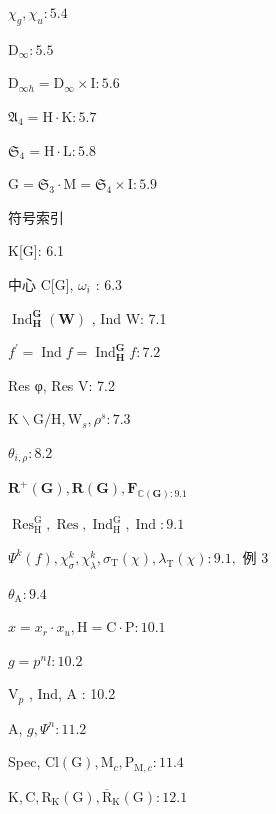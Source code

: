 \documentclass[10pt]{article}
\begin{document}
\({\chi }_{g},{\chi }_{u} : {5.4}\)

\({\mathrm{D}}_{\infty } : {5.5}\)

\({\mathrm{D}}_{\infty h} = {\mathrm{D}}_{\infty } \times  \mathrm{I} : {5.6}\)

\({\mathfrak{A}}_{4} = \mathrm{H} \cdot  \mathrm{K} : {5.7}\)

\({\mathfrak{S}}_{4} = \mathrm{H} \cdot  \mathrm{L} : {5.8}\)

\(\mathrm{G} = {\mathfrak{S}}_{3} \cdot  \mathrm{M} = {\mathfrak{S}}_{4} \times  \mathrm{I} : {5.9}\)

符号索引

K[G]: 6.1

中心 C[G], \({\omega }_{i}\) : 6.3

\({\operatorname{Ind}}_{\mathbf{H}}^{\mathbf{G}}\left( \mathbf{W}\right)\) , Ind W: 7.1

\({f}^{\prime } = \operatorname{Ind}f = {\operatorname{Ind}}_{\mathbf{H}}^{\mathbf{G}}f : {7.2}\)

Res φ, Res V: 7.2

\(\mathrm{K} \smallsetminus  \mathrm{G}/\mathrm{H},{\mathrm{W}}_{s},{\rho }^{s} : {7.3}\)

\({\theta }_{i,\rho } : {8.2}\)

\({\mathbf{R}}^{ + }\left( \mathbf{G}\right) ,\mathbf{R}\left( \mathbf{G}\right) ,{\mathbf{F}}_{\mathbb{C}\left( \mathbf{G}\right)  : {9.1}}\)

\({\operatorname{Res}}_{\mathrm{H}}^{\mathrm{G}},\operatorname{Res},{\operatorname{Ind}}_{\mathrm{H}}^{\mathrm{G}},\operatorname{Ind} : {9.1}\)

\({\Psi }^{k}\left( f\right) ,{\chi }_{\sigma }^{k},{\chi }_{\lambda }^{k},{\sigma }_{\mathrm{T}}\left( \chi \right) ,{\lambda }_{\mathrm{T}}\left( \chi \right)  : {9.1},\) 例 3

\({\theta }_{\mathrm{A}} : {9.4}\)

\(x = {x}_{r} \cdot  {x}_{u},\mathrm{H} = \mathrm{C} \cdot  \mathrm{P} : {10.1}\)

\(g = {p}^{n}l : {10.2}\)

\({\mathrm{V}}_{p}\) , Ind, A : 10.2

A, \(g,{\Psi }^{n} : {11.2}\)

Spec, \(\mathrm{{Cl}}\left( \mathrm{G}\right) ,{\mathrm{M}}_{c},{\mathrm{P}}_{\mathrm{M},c} : {11.4}\)

\(\mathrm{K},\mathrm{C},{\mathrm{R}}_{\mathrm{K}}\left( \mathrm{G}\right) ,{\overline{\mathrm{R}}}_{\mathrm{K}}\left( \mathrm{G}\right)  : {12.1}\)
\end{document}
